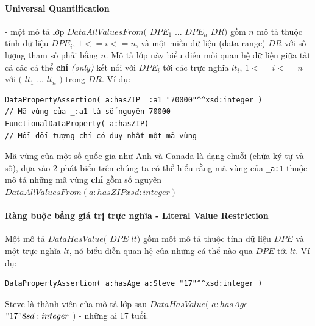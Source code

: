 \paragraph{Universal Quantification} - một mô tả lớp $DataAllValuesFrom($ $DPE_{1}$ ... $DPE_{n}$ $DR)$ gồm $n$ mô tả thuộc tính dữ liệu $DPE_{i}$, $1<=i<=n$, và một miền dữ liệu (data range) $DR$ với số lượng tham số phải bằng $n$. Mô tả lớp này biểu diễn mối quan hệ dữ liệu giữa tất cả các cá thể \textbf{chỉ} \textit{(only)} kết nối với $DPE_{i}$ tới các trực nghĩa $lt_{i}$, $1<=i<=n$ với $($ $lt_{1}$ ... $lt_{n}$ $)$ trong $DR$. Ví dụ: 

\begin{verbatim}
DataPropertyAssertion( a:hasZIP _:a1 "70000"^^xsd:integer ) 
// Mã vùng của _:a1 là số nguyên 70000
FunctionalDataProperty( a:hasZIP) 
// Mỗi đối tượng chỉ có duy nhất một mã vùng
\end{verbatim}
Mã vùng của một số quốc gia như Anh và Canada là dạng chuỗi (chứa ký tự và số), dựa vào 2 phát biểu trên chúng ta có thể hiểu rằng mã vùng của \verb|_a:1| thuộc mô tả những mã vùng \textbf{chỉ} gồm số nguyên $DataAllValuesFrom( a:hasZIP xsd:integer )$

\paragraph{Ràng buộc bằng giá trị trực nghĩa - Literal Value Restriction}
Một mô tả $DataHasValue($ $DPE$ $lt)$ gồm một mô tả thuộc tính dữ liệu $DPE$ và một trực nghĩa $lt$, nó biểu diễn quan hệ của những cá thể nào qua $DPE$ tới $lt$. Ví dụ:
\begin{verbatim}
DataPropertyAssertion( a:hasAge a:Steve "17"^^xsd:integer )
\end{verbatim}
Steve là thành viên của mô tả lớp sau $DataHasValue($ $a:hasAge$ $"17"^^xsd:integer$ $)$ - những ai 17 tuổi.

